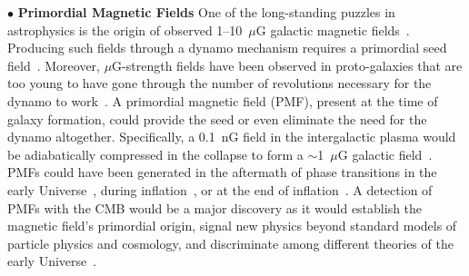 \documentclass[PICOReport.tex]{subfiles}
\begin{document}
$\bullet$ {\bf Primordial Magnetic Fields} \hspace{0.1in} One of the long-standing puzzles in astrophysics is the origin of observed 1--10~$\mu$G galactic magnetic fields~\citep{Widrow:2002ud}. Producing such fields through a dynamo mechanism requires a primordial seed field~\citep{Widrow:2011hs}. Moreover, $\mu$G-strength fields have been observed in proto-galaxies that are too young to have gone through the number of revolutions necessary for the dynamo to work~\citep{Athreya:1998}. A primordial magnetic field (PMF), present at the time of galaxy formation, could provide the seed or even eliminate the need for the dynamo altogether. Specifically, a 0.1~nG field in the intergalactic plasma would be adiabatically compressed in the collapse to form a $\sim$1~$\mu$G galactic field~\citep{Grasso:2000wj}.
PMFs could have been generated in the aftermath of phase transitions in the early Universe~\citep{Vachaspati:1991nm}, during inflation~\cite{Turner:1987bw,Ratra:1991bn}, or at the end of inflation~\cite{DiazGil:2007dy}. A detection of PMFs with the CMB would be a major discovery as it would establish the magnetic field's primordial origin, signal new physics beyond standard models of particle physics and cosmology, and discriminate among different theories of the early Universe~\cite{Barnaby:2012tk,Long:2013tha,Durrer:2013pga}.
\end{document}
